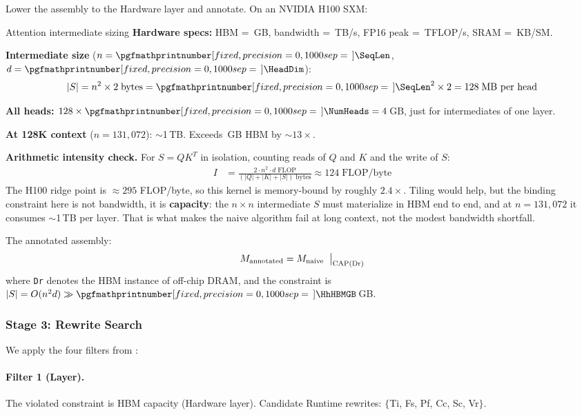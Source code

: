 \documentclass[10pt,twocolumn]{article}
\newcommand{\cval}[1]{\pgfmathprintnumber[fixed, precision=1, 1000 sep={\,}]{#1}}
\newcommand{\cvalint}[1]{\pgfmathprintnumber[fixed, precision=0, 1000 sep={\,}]{#1}}
\newcommand{\AttnIntermMB}{128}       %
\newcommand{\AttnTotalGB}{4}          %
\begin{document}
Lower the assembly to the Hardware layer and annotate. On an NVIDIA H100 SXM:

\begin{napkinmath}{Attention intermediate sizing}
\textbf{Hardware specs:} HBM = \cvalint{\HhHBMGB}\,GB, bandwidth = \cval{\HhBWTBs}\,TB/s, FP16 peak = \cvalint{\HhPeakTFLOPS}\,TFLOP/s, SRAM = \cvalint{\SRAMperSMKB}\,KB/SM.

\textbf{Intermediate size} ($n = \cvalint{\SeqLen}$, $d = \cvalint{\HeadDim}$):
\[
|S| = n^2 \times 2\;\text{bytes} = \cvalint{\SeqLen}^2 \times 2 = \AttnIntermMB{}\;\text{MB per head}
\]

\textbf{All heads:} $\AttnIntermMB{} \times \cvalint{\NumHeads} = \AttnTotalGB{}$\,GB, just for intermediates of one layer.

\textbf{At 128K context} ($n = 131{,}072$): ${\sim}$1\,TB. Exceeds \cvalint{\HhHBMGB}\,GB HBM by ${\sim}13\times$.

\textbf{Arithmetic intensity check.} For $S = QK^T$ in isolation, counting reads of $Q$ and $K$ and the write of $S$:
\begin{align*}
I &= \frac{2 \cdot n^2 \cdot d\;\text{FLOP}}{(|Q| + |K| + |S|)\;\text{bytes}} \approx 124\;\text{FLOP/byte}
\end{align*}
The H100 ridge point is $\approx 295$ FLOP/byte, so this kernel is memory-bound by roughly $2.4\times$. Tiling would help, but the binding constraint here is not bandwidth, it is \textbf{capacity}: the $n \times n$ intermediate $S$ must materialize in HBM end to end, and at $n = 131{,}072$ it consumes $\sim$1\,TB per layer. That is what makes the naive algorithm fail at long context, not the modest bandwidth shortfall.
\end{napkinmath}

The annotated assembly:
\begin{equation}
M_{\text{annotated}} = M_{\text{naive}} \;\bigm|_{\text{CAP}(\text{Dr})}
\end{equation}
where \texttt{Dr} denotes the HBM instance of off-chip DRAM, and the constraint is $|S| = O(n^2 d) \gg \cvalint{\HhHBMGB}$\,GB.

\subsubsection{Stage 3: Rewrite Search}

We apply the four filters from :

\paragraph{Filter 1 (Layer).} The violated constraint is HBM capacity (Hardware layer). Candidate Runtime rewrites: $\{$Ti, Fs, Pf, Cc, Sc, Vr$\}$.
\end{document}
